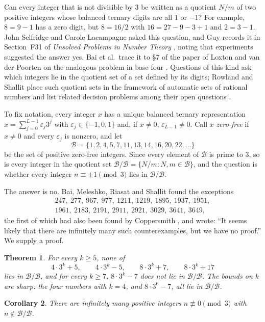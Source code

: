\documentclass[11pt]{amsart}
\newtheorem{theorem}{Theorem}[section]
\newtheorem{corollary}[theorem]{Corollary}
\theoremstyle{definition}
\newcommand{\B}{\mathcal{B}}
\begin{document}
Can every integer that is not divisible by $3$ be written as a quotient $N/m$ of two positive
integers whose balanced ternary digits are all $1$ or $-1$? For example, $8=9-1$ has a zero digit, but
$8=16/2$ with $16=27-9-3+1$ and $2=3-1$. John Selfridge and Carole Lacampagne asked this question, and
Guy records it in Section~F31 of \emph{Unsolved Problems in Number Theory} \cite[pp.~403--404]{Guy04},
noting that experiments suggested the answer yes. Bai et al.\ trace it to \S7 of the paper of Loxton and
van der Poorten on the analogous problem in base four \cite{LvdP}. Questions of this kind ask which
integers lie in the quotient set of a set defined by its digits; Rowland and Shallit place such
quotient sets in the framework of automatic sets of rational numbers and list related decision
problems among their open questions \cite{RS}.

To fix notation, every integer $x$ has a unique balanced ternary representation
$x=\sum_{j=0}^{L-1}\varepsilon_j 3^j$ with $\varepsilon_j\in\{-1,0,1\}$ and, if $x\ne 0$,
$\varepsilon_{L-1}\ne 0$. Call $x$ \emph{zero-free} if $x\ne 0$ and every $\varepsilon_j$ is nonzero, and
let
\[
\B=\{1,2,4,5,7,11,13,14,16,20,22,\dots\}
\]
be the set of positive zero-free integers. Since every element of $\B$ is prime to $3$, so is every
integer in the quotient set $\B/\B=\{N/m : N,m\in\B\}$, and the question is whether every integer
$n\equiv\pm1\pmod 3$ lies in $\B/\B$.

The answer is no. Bai, Meleshko, Riasat and Shallit \cite{BMRS} found the exceptions
\[
\begin{gathered}
247,\ 277,\ 967,\ 977,\ 1211,\ 1219,\ 1895,\ 1937,\ 1951,\\
1961,\ 2183,\ 2191,\ 2911,\ 2921,\ 3029,\ 3641,\ 3649,
\end{gathered}
\]
the first of which had also been found by Coppersmith \cite[F31]{Guy04}, and wrote: ``It seems likely
that there are infinitely many such counterexamples, but we have no proof.'' We supply a proof.

\begin{theorem}\label{thm:main}
For every $k\ge 5$, none of
\[
4\cdot 3^k+5,\qquad 4\cdot 3^k-5,\qquad 8\cdot 3^k+7,\qquad 8\cdot 3^k+17
\]
lies in $\B/\B$, and for every $k\ge 7$, $8\cdot 3^k-7$ does not lie in $\B/\B$. The bounds on $k$ are
sharp: the four numbers with $k=4$, and $8\cdot 3^6-7$, all lie in $\B/\B$.
\end{theorem}

\begin{corollary}
There are infinitely many positive integers $n\not\equiv 0\pmod 3$ with $n\notin\B/\B$.
\end{corollary}
\end{document}
